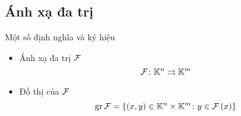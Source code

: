 \subsection{Ánh xạ đa trị}

\begin{frame}{Một số định nghĩa và ký hiệu}
    \begin{itemize}
        \item Ánh xạ đa trị \(\mathcal{F}\)
        \begin{equation}
            \mathcal{F}\colon\mathbb{K}^{n}\rightrightarrows\mathbb{K}^{m}
        \end{equation}
        \item Đồ thị của \(\mathcal{F}\)
        \begin{equation}
            \operatorname{gr}\mathcal{F}=\left\{ \left(x,y\right)\in\mathbb{K}^{n}\times\mathbb{K}^{m}\colon y\in\mathcal{F}\left(x\right)\right\} 
        \end{equation}
    \end{itemize}
\end{frame}

